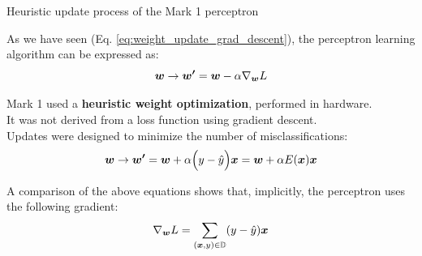 \begin{frame}[t]{Heuristic update process of the Mark 1 perceptron}

    As we have seen (Eq. \ref{eq:weight_update_grad_descent}), 
    the \gls{perceptron} 
    learning algorithm can be expressed as:
    \begin{equation*}
        \boldsymbol{w} \rightarrow \boldsymbol{w^\prime} = \boldsymbol{w} - \alpha \nabla_{\boldsymbol{w}} L
    \end{equation*}

    Mark 1 used a {\bf heuristic weight optimization}, performed in hardware.\\
    It was not derived from a \gls{loss function} 
    using \gls{gradient descent}.\\
    \vspace{0.2cm} 
    Updates were designed to minimize the number of misclassifications:\\
    \begin{equation}
        \boldsymbol{w} \rightarrow \boldsymbol{w^\prime} = 
        \boldsymbol{w} + \alpha \Big(y - \hat{y}\Big) \boldsymbol{x} =
        \boldsymbol{w} + \alpha E(\boldsymbol{x}) \boldsymbol{x} 
        \label{eq:percepton_weight_update_1}
    \end{equation}

    A comparison of the above equations shows that, 
    implicitly, the \gls{perceptron} 
    uses the following gradient: 
    \begin{equation}
        \nabla_{\boldsymbol{w}} L = 
          \sum_{(\boldsymbol{x},y) \in \mathbb{D}} 
          (y - \hat{y}) \boldsymbol{x}
    \label{eq:percepton_smooth_gradient_1}  
    \end{equation}



\end{frame}



%
%
%

